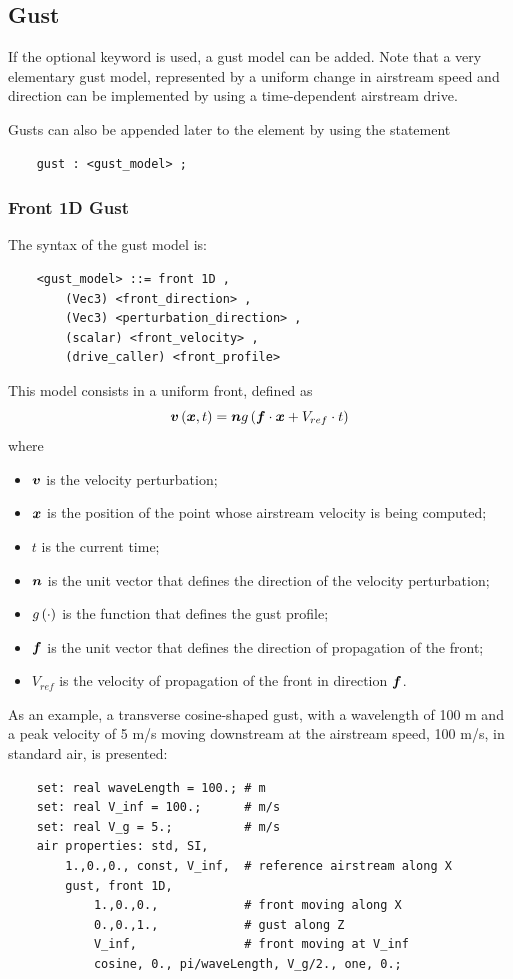 \subsection{Gust}
If the optional  keyword is used, a gust model can be added.
Note that a very elementary gust model, represented by a uniform change
in airstream speed and direction can be implemented by using
a time-dependent airstream drive.

Gusts can also be appended later to the  element
by using the statement
\begin{verbatim}
    gust : <gust_model> ;
\end{verbatim}


\subsubsection{Front 1D Gust}
The syntax of the  gust model is:
\begin{verbatim}
    <gust_model> ::= front 1D ,
        (Vec3) <front_direction> ,
        (Vec3) <perturbation_direction> ,
        (scalar) <front_velocity> ,
        (drive_caller) <front_profile>
\end{verbatim}
This model consists in a uniform front, defined as
\begin{displaymath}
	\boldsymbol{v}\left( \boldsymbol{x}, t \right) = \boldsymbol{n} g\left( \boldsymbol{f} \cdot \boldsymbol{x} + V_{ref} \cdot t \right)
\end{displaymath}
where
\begin{itemize}
\item $\boldsymbol{v}$ is the velocity perturbation;
\item $\boldsymbol{x}$ is the position of the point whose airstream velocity
is being computed;
\item $t$ is the current time;
\item $\boldsymbol{n}$ is the unit vector  
that defines the direction of the velocity perturbation;
\item $g\left( \cdot \right)$ is the function  
that defines the gust profile;
\item $\boldsymbol{f}$ is the unit vector  
that defines the direction of propagation of the front;
\item $V_{ref}$ is the velocity  
of propagation of the front in direction $\boldsymbol{f}$.
\end{itemize}
As an example, a transverse cosine-shaped gust, with a wavelength of 100 m
and a peak velocity of 5 m/s moving downstream at the airstream speed,
100 m/s, in standard air, is presented:
\begin{verbatim}
    set: real waveLength = 100.; # m
    set: real V_inf = 100.;      # m/s
    set: real V_g = 5.;          # m/s
    air properties: std, SI,
        1.,0.,0., const, V_inf,  # reference airstream along X
        gust, front 1D,
            1.,0.,0.,            # front moving along X
            0.,0.,1.,            # gust along Z
            V_inf,               # front moving at V_inf
            cosine, 0., pi/waveLength, V_g/2., one, 0.;
\end{verbatim}



